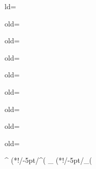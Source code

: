 \usepackage[cal=rsfs]{mathalfa}
\newcommand{\Changel}{\mathcode`l="7160}
\newcommand{\Changelback}{\mathcode`l="716C}
\newcommand{\NoChangel}[1]{%
\expandafter\let\csname old\string#1\endcsname=#1
\let#1=\relax
\newcommand{#1}{\mathcode`l="716C\csname old\string#1\endcsname\mathcode`l="7160 }%
}

\NoChangel{\log}
\NoChangel{\ln}
\NoChangel{\lim}
\NoChangel{\limsup}
\NoChangel{\liminf}
\NoChangel{\varlimsup}
\NoChangel{\varliminf}
\NoChangel{\varinjlim}
\NoChangel{\varprojlim}

\usepackage{tikz}
\usetikzlibrary{cd}
\newcommand{\dradpl}{{\hspace*{-2.5mm}\begin{tikzcd}[ampersand replacement=\&,column sep = scriptsize]\mbox{}\ar[r,dashed]\&\mbox{}\end{tikzcd}\hspace*{-2mm}}}
\newcommand{\dratst}{{\hspace*{-2.5mm}\begin{tikzcd}[ampersand replacement=\&,column sep = small]\mbox{}\ar[r,dashed]\&\mbox{}\end{tikzcd}\hspace*{-2mm}}}
\let\drascst\dratst
\newcommand{\dra}{\mathchoice{\dradpl}{\dratst}{\drascst}{\drascst}}
\let\ra\rightarrow
\newcommand\hto{\mathrel{\lhook\joinrel\to}}
\newcommand\mto{\mathchoice{\longmapsto}{\mapsto}{\mapsto}{\mapsto}}
\newcommand{\To}[1]{\mathchoice{\xrightarrow{\textstyle\kern4pt#1\kern3pt}}{\stackrel{#1}{\longrightarrow}}{}{}}

\newcommand{\Psfrac}[2]{(\sfrac{#1}{#2})}
\newcommand{\Pspfrac}[2]{(\sfrac{#1}{(#2)})}
\newcommand{\Ppsfrac}[2]{(\sfrac{(#1)}{#2})}
\newcommand{\psfrac}[2]{\sfrac{(#1)}{#2}}
\newcommand{\spfrac}[2]{\sfrac{#1}{(#2)}}
\newcommand{\pspfrac}[2]{\sfrac{(#1)}{(#2)}}

\newenvironment{enumeratei}
{\bgroup\def\theenumi{\roman{enumi}}\def\theenumii{\arabic{enumii}}\begin{enumerate}}
{\end{enumerate}\egroup}

\let\epsilon\varepsilon
\DeclareMathOperator{\divv}{div}\let\div\divv
\newcommand{\sep}{\,;\,}
\newcommand{\cHom}{\mathcal{H}\!om}

\usepackage[all,cmtip]{xy}
\newdir^{ (}{{}*!/-5pt/\dir^{(}}
\newdir_{ (}{{}*!/-5pt/\dir_{(}}

\theoremstyle{plain}
\newtheorem{thm}{Theorem}[section]
\newtheorem{cor}[thm]{Corollary}
\newtheorem{lem}[thm]{Lemma}
\newtheorem{prop}[thm]{Proposition}

